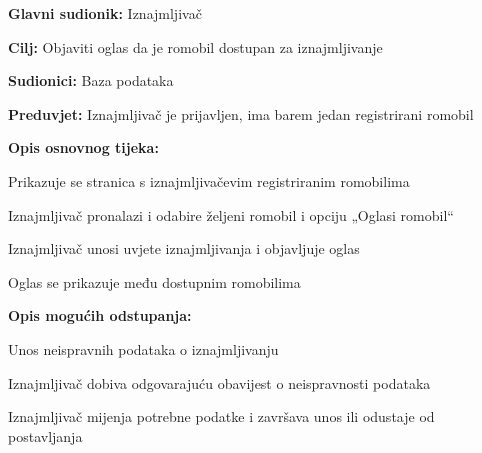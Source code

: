 						\begin{packed_item}
							
							\item \textbf{Glavni sudionik: }Iznajmljivač
							\item  \textbf{Cilj: }Objaviti oglas da je romobil dostupan za iznajmljivanje
							\item  \textbf{Sudionici:} Baza podataka
							\item  \textbf{Preduvjet:} Iznajmljivač je prijavljen, ima barem jedan registrirani romobil
							\item  \textbf{Opis osnovnog tijeka:}
							
							\item[] \begin{packed_enum}
								
								\item Prikazuje se stranica s iznajmljivačevim registriranim romobilima
								\item Iznajmljivač pronalazi i odabire željeni romobil i opciju „Oglasi romobil“
								\item Iznajmljivač unosi uvjete iznajmljivanja i objavljuje oglas
								\item Oglas se prikazuje među dostupnim romobilima
								  
							\end{packed_enum}
							
							\item  \textbf{Opis mogućih odstupanja:}
							
							\item[] \begin{packed_item}
								
								\item[3.a] Unos neispravnih podataka o iznajmljivanju 
								\item[] \begin{packed_enum}
									
									\item Iznajmljivač dobiva odgovarajuću obavijest o neispravnosti podataka 
									\item Iznajmljivač mijenja potrebne podatke i završava unos ili odustaje od postavljanja 
									
								\end{packed_enum}
								
								
							\end{packed_item}
						\end{packed_item}
